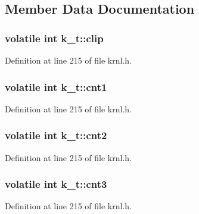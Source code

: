 \subsection{Member Data Documentation}
\hypertarget{structk__t_ad58455e7feb435218e12629a6b8321b9}{}
\subsubsection[{clip}]{\setlength{\rightskip}{0pt plus 5cm}volatile int k\+\_\+t\+::clip}\label{structk__t_ad58455e7feb435218e12629a6b8321b9}


Definition at line 215 of file krnl.\+h.

\hypertarget{structk__t_a7ef04bafaf2e57965dfa0c8a1d14d124}{}
\subsubsection[{cnt1}]{\setlength{\rightskip}{0pt plus 5cm}volatile int k\+\_\+t\+::cnt1}\label{structk__t_a7ef04bafaf2e57965dfa0c8a1d14d124}


Definition at line 215 of file krnl.\+h.

\hypertarget{structk__t_a7ae00f43d917f25200fffd1a8defe5ef}{}
\subsubsection[{cnt2}]{\setlength{\rightskip}{0pt plus 5cm}volatile int k\+\_\+t\+::cnt2}\label{structk__t_a7ae00f43d917f25200fffd1a8defe5ef}


Definition at line 215 of file krnl.\+h.

\hypertarget{structk__t_aec4d7232788478d29abb708ca07f6796}{}
\subsubsection[{cnt3}]{\setlength{\rightskip}{0pt plus 5cm}volatile int k\+\_\+t\+::cnt3}\label{structk__t_aec4d7232788478d29abb708ca07f6796}


Definition at line 215 of file krnl.\+h.

\hypertarget{structk__t_ab5c4013797f848b7f3d306c8b12375b0}{}
